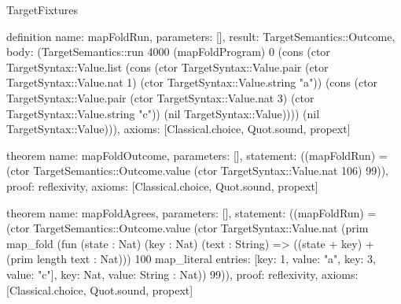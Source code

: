\begin{lexlean}{TargetFixtures}
\begin{semanticmodule}
definition{
  name: mapFoldRun,
  parameters: [],
  result: TargetSemantics::Outcome,
  body: (TargetSemantics::run 4000 (mapFoldProgram) 0 (cons (ctor TargetSyntax::Value.list (cons (ctor TargetSyntax::Value.pair (ctor TargetSyntax::Value.nat 1) (ctor TargetSyntax::Value.string "a")) (cons (ctor TargetSyntax::Value.pair (ctor TargetSyntax::Value.nat 3) (ctor TargetSyntax::Value.string "c")) (nil TargetSyntax::Value)))) (nil TargetSyntax::Value))),
  axioms: [Classical.choice, Quot.sound, propext]
}

theorem{
  name: mapFoldOutcome,
  parameters: [],
  statement: ((mapFoldRun) = (ctor TargetSemantics::Outcome.value (ctor TargetSyntax::Value.nat 106) 99)),
  proof: reflexivity{},
  axioms: [Classical.choice, Quot.sound, propext]
}

theorem{
  name: mapFoldAgrees,
  parameters: [],
  statement: ((mapFoldRun) = (ctor TargetSemantics::Outcome.value (ctor TargetSyntax::Value.nat (prim map_fold (fun (state : Nat) (key : Nat) (text : String) => ((state + key) + (prim length text : Nat))) 100 map_literal{
    entries: [{key: 1, value: "a"}, {key: 3, value: "c"}],
    key: Nat,
    value: String
  } : Nat)) 99)),
  proof: reflexivity{},
  axioms: [Classical.choice, Quot.sound, propext]
}


\end{semanticmodule}
\end{lexlean}
